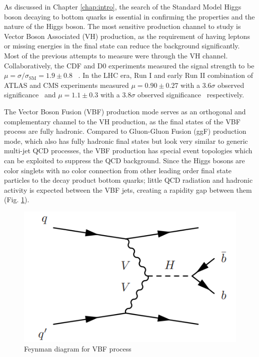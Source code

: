 As discussed in Chapter \ref{chap:intro}, the search of the Standard Model Higgs boson decaying to bottom quarks is essential in confirming the properties and the nature of the Higgs boson. The most sensitive production channel to study \Hbb is Vector Boson Associated (VH) production, as the requirement of having leptons or missing energies in the final state can reduce the background significantly. Most of the previous attempts to measure \Hbb were through the VH channel. Collaboratively, the CDF and D0 experiments measured the \Hbb signal strength to be $\mu=\sigma/\sigma_\text{SM}=1.9 \pm 0.8$ ~\cite{Aaltonen:2012qt}. In the LHC era, Run I and early Run II combination of ATLAS and CMS experiments measured $\mu=0.90 \pm 0.27$ with a $3.6\sigma$ observed significance~\cite{HIGG-2016-29} and $\mu=1.1 \pm 0.3$ with a $3.8\sigma$ observed significance~\cite{CMS-HIG-16-044} respectively.

The Vector Boson Fusion (VBF) production mode serves as an orthogonal and complementary channel to the VH production, as the final states of the VBF \Hbb process are fully hadronic. Compared to Gluon-Gluon Fusion (ggF) production mode, which also has fully hadronic final states but look very similar to generic multi-jet QCD processes, the VBF production has special event topologies which can be exploited to suppress the QCD background. Since the Higgs bosons are color singlets with no color connection from other leading order final state particles to the decay product bottom quarks; little QCD radiation and hadronic activity is expected between the VBF jets, creating a rapidity gap between them (Fig. \ref{fig:vbf-feynman}).

\begin{figure}[htpb!]
\begin{center}
  \includegraphics[width=0.55\linewidth]{figures/VBF/VBFFeynman.png}
\caption{Feynman diagram for VBF \Hbb process}
\label{fig:vbf-feynman}
\end{center}
\end{figure}


